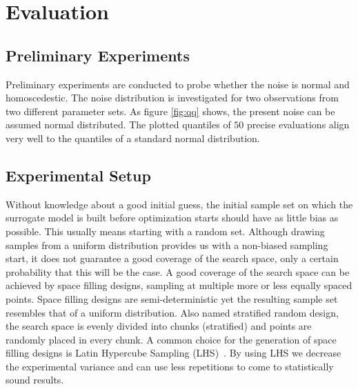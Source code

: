 \documentclass[preprint,12pt]{elsarticle}
\begin{document}
\section{Evaluation}

\subsection{Preliminary Experiments}

Preliminary experiments are conducted to probe whether the noise is normal and homoscedestic. The noise distribution is investigated for two observations from two different parameter sets.
As figure \ref{fig:qq} shows, the present noise can be assumed normal distributed. The plotted quantiles of $50$ precise evaluations align very well to the quantiles of a standard normal distribution.  

\subsection{Experimental Setup}

Without knowledge about a good initial guess, the initial sample set on which the surrogate model is built before optimization starts should have as little bias as possible. 
This usually means starting with a random set. 
Although drawing samples from a uniform distribution provides us with a non-biased sampling start, it does not guarantee a good coverage of the search space, only a certain probability that this will be the case.
A good coverage of the search space can be achieved by space filling designs, sampling at multiple more or less equally spaced points. 
Space filling designs are semi-deterministic yet the resulting sample set resembles that of a uniform distribution.
Also named stratified random design, the search space is evenly divided into chunks (stratified) and points are randomly placed in every chunk.
A common choice for the generation of space filling designs is Latin Hypercube Sampling (LHS)~\cite{mckaya1979}.
By using LHS we decrease the experimental variance and can use less repetitions to come to statistically sound results.
\end{document}
